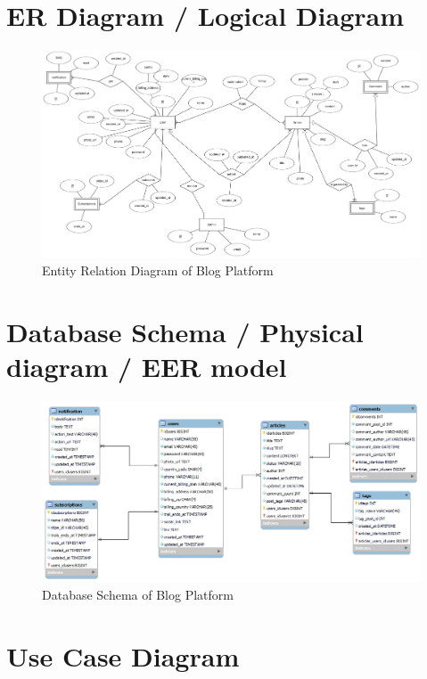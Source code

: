 \documentclass{article}
\begin{document}
\noindent \section{ER Diagram / Logical Diagram}

\begin{figure}[h]
\centering
\includegraphics[width=1\textwidth]{DB_ERD.png}
\caption{Entity Relation Diagram of Blog Platform}
\end{figure}

\noindent 
\newpage

\noindent \section{Database Schema / Physical diagram / EER model }

\begin{figure}[h]
\centering
\includegraphics[width=1\textwidth]{DB_Diagram.png}
\caption{Database Schema of Blog Platform}
\end{figure}

\noindent 
\newpage

\noindent \section{Use Case Diagram }
\end{document}
